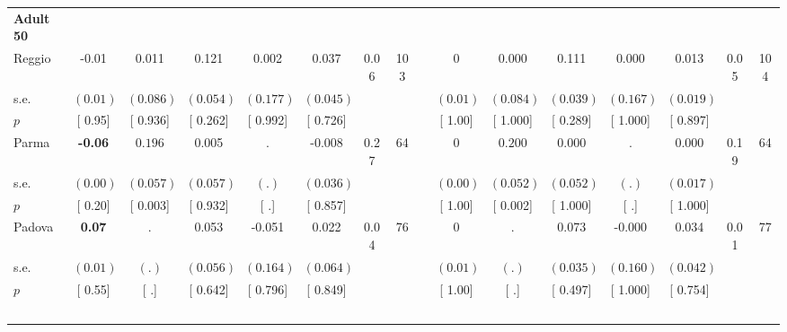 \begin{longtable}{L{8em} c c c c c c c p{1em} c c c c c c c}
\quad \quad \textbf{Adult 50} & & & & & & & & & & & & & & & \\* 
\quad \quad \quad Reggio& -0.01 &     0.011 &     0.121 &     0.002 &     0.037 &      0.06 &       103 & & 0 &     0.000 &     0.111 &     0.000 &     0.013 &      0.05 &       104  \\*
\quad \quad \quad \quad s.e.& $ (     0.01)$ & $ (    0.086)$ & $ (    0.054)$ & $ (    0.177)$ & $ (    0.045)$ & & & & $ (     0.01)$ & $ (    0.084)$ & $ (    0.039)$ & $ (    0.167)$ & $ (    0.019)$ & &  \\*
\quad \quad \quad \quad $ p$ & [     0.95] & [    0.936] & [    0.262] & [    0.992] & [    0.726] & & & & [     1.00] & [    1.000] & [    0.289] & [    1.000] & [    0.897] & &  \\[1em]
\quad \quad \quad Parma& \textbf{    -0.06} & $ \mathbf{    0.196}$ &     0.005 &         . &    -0.008 &      0.27 &        64 & & 0 & $ \mathbf{    0.200}$ &     0.000 &         . &     0.000 &      0.19 &        64  \\*
\quad \quad \quad \quad s.e.& $ (     0.00)$ & $ (    0.057)$ & $ (    0.057)$ & $ (        .)$ & $ (    0.036)$ & & & & $ (     0.00)$ & $ (    0.052)$ & $ (    0.052)$ & $ (        .)$ & $ (    0.017)$ & &  \\*
\quad \quad \quad \quad $ p$ & [     0.20] & [    0.003] & [    0.932] & [        .] & [    0.857] & & & & [     1.00] & [    0.002] & [    1.000] & [        .] & [    1.000] & &  \\[1em]
\quad \quad \quad Padova& \textbf{     0.07} &         . &     0.053 &    -0.051 &     0.022 &      0.04 &        76 & & 0 &         . &     0.073 &    -0.000 &     0.034 &      0.01 &        77  \\*
\quad \quad \quad \quad s.e.& $ (     0.01)$ & $ (        .)$ & $ (    0.056)$ & $ (    0.164)$ & $ (    0.064)$ & & & & $ (     0.01)$ & $ (        .)$ & $ (    0.035)$ & $ (    0.160)$ & $ (    0.042)$ & &  \\*
\quad \quad \quad \quad $ p$ & [     0.55] & [        .] & [    0.642] & [    0.796] & [    0.849] & & & & [     1.00] & [        .] & [    0.497] & [    1.000] & [    0.754] & &  \\[1em]
~\\[1em]
\end{longtable}